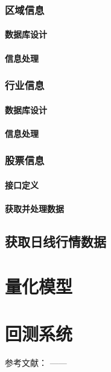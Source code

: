 \documentclass{article}
\begin{document}
\subsubsection{区域信息}
\paragraph{数据库设计}
\paragraph{信息处理}
\subsubsection{行业信息}
\paragraph{数据库设计}
\paragraph{信息处理}
\subsubsection{股票信息}
\paragraph{接口定义}
\paragraph{获取并处理数据}
\subsection{获取日线行情数据}
\section{量化模型}
\section{回测系统}

参考文献：
\cite{ex1}---\cite{ex2}---\cite{refa001}

\newpage




\appendix
\end{document}
